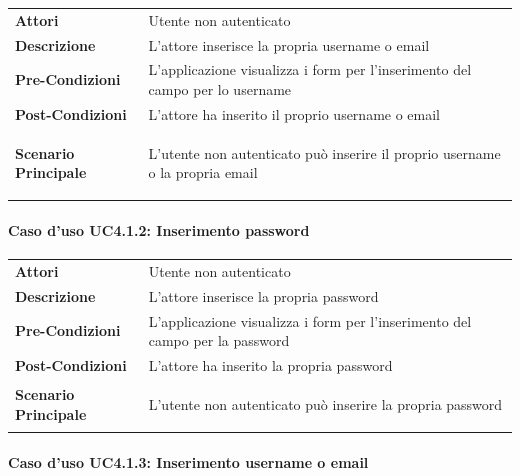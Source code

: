 \begin{longtable}{ l | p{11cm}}
	\hline
	\rowcolor{Gray}
	\multicolumn{2}{c}{Caso d'uso UC4.1.1:  Inserimento username o email} \\
	\hline
	\textbf{Attori} & Utente non autenticato \\
	\textbf{Descrizione} & L'attore inserisce la propria username o email  \\
	\textbf{Pre-Condizioni} & L'applicazione visualizza i form per l'inserimento del campo per lo username \\
	\textbf{Post-Condizioni} & L'attore ha inserito il proprio username o email \\
	\textbf{Scenario Principale} & \begin{enumerate*}[label=(\arabic*.),itemjoin={\newline}]
		\item L'utente non autenticato può inserire il proprio username o la propria email
	\end{enumerate*}\\
\end{longtable}

\paragraph{Caso d'uso UC4.1.2:  Inserimento password}
\label{UC4_1_2}

\begin{longtable}{ l | p{11cm}}
	\hline
	\rowcolor{Gray}
	\multicolumn{2}{c}{Caso d'uso UC4.1.2:  Inserimento password} \\
	\hline
	\textbf{Attori} & Utente non autenticato \\
	\textbf{Descrizione} & L'attore inserisce la propria password  \\
	\textbf{Pre-Condizioni} & L'applicazione visualizza i form per l'inserimento del campo per la password \\
	\textbf{Post-Condizioni} & L'attore ha inserito la propria password \\
	\textbf{Scenario Principale} & \begin{enumerate*}[label=(\arabic*.),itemjoin={\newline}]
		\item L'utente non autenticato può inserire la propria password
	\end{enumerate*}\\
\end{longtable}

\paragraph{Caso d'uso UC4.1.3:  Inserimento username o email}
\label{UC4_1_3}

